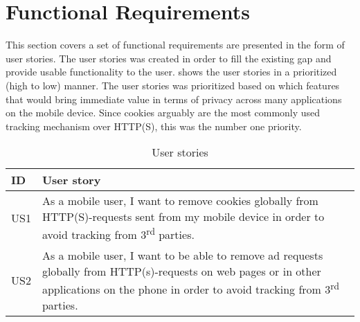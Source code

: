 \documentclass[main.tex]{subfiles}
\begin{document}
\section{Functional Requirements}
\label{sec:requirements}

This section covers a set of functional requirements are presented in the form of user stories. The user stories was created in order to fill the existing gap and provide usable functionality to the user.  shows the user stories in a prioritized (high to low) manner. The user stories was prioritized based on which features that would bring immediate value in terms of privacy across many applications on the mobile device. Since cookies arguably are the most commonly used tracking mechanism over HTTP(S), this was the number one priority.


\begin{table}[H]
    \centering
    \begin{tabular}{|p{1cm}|p{12cm}|} \hline
        \textbf{ID} & \textbf{User story} \\ \hline
        US1 & As a mobile user, I want to remove cookies globally from HTTP(S)-requests sent from my mobile device in order to avoid tracking from 3\textsuperscript{rd} parties. \\ \hline
        US2 & As a mobile user, I want to be able to remove ad requests globally from HTTP(s)-requests on web pages or in other applications on the phone in order to avoid tracking from 3\textsuperscript{rd} parties. \\ \hline
    \end{tabular}
    \caption{User stories}
    \label{tab:user_stories}
\end{table}
\end{document}
